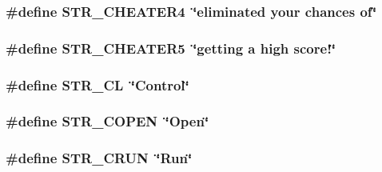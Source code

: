\label{FOREIGN_8H_a9b0cd198a6495bd0e515f7766192b57f}
\hypertarget{FOREIGN_8H_a4b8e72c3dab5be98c1d1347c5cedb2f4}{
\subsubsection[{STR\_\-CHEATER4}]{\setlength{\rightskip}{0pt plus 5cm}\#define STR\_\-CHEATER4~\char`\"{}eliminated your chances of\char`\"{}}}
\label{FOREIGN_8H_a4b8e72c3dab5be98c1d1347c5cedb2f4}
\hypertarget{FOREIGN_8H_a29835915ad7521839054c865dd6ccd25}{
\subsubsection[{STR\_\-CHEATER5}]{\setlength{\rightskip}{0pt plus 5cm}\#define STR\_\-CHEATER5~\char`\"{}getting a high score!\char`\"{}}}
\label{FOREIGN_8H_a29835915ad7521839054c865dd6ccd25}
\hypertarget{FOREIGN_8H_ab290e2bc18995113971a1da6495e2c21}{
\subsubsection[{STR\_\-CL}]{\setlength{\rightskip}{0pt plus 5cm}\#define STR\_\-CL~\char`\"{}Control\char`\"{}}}
\label{FOREIGN_8H_ab290e2bc18995113971a1da6495e2c21}
\hypertarget{FOREIGN_8H_a19f9c1096494183513c9856732ee45b3}{
\subsubsection[{STR\_\-COPEN}]{\setlength{\rightskip}{0pt plus 5cm}\#define STR\_\-COPEN~\char`\"{}Open\char`\"{}}}
\label{FOREIGN_8H_a19f9c1096494183513c9856732ee45b3}
\hypertarget{FOREIGN_8H_a2c216c6320a281ef26a1be4db3f62ec2}{
\subsubsection[{STR\_\-CRUN}]{\setlength{\rightskip}{0pt plus 5cm}\#define STR\_\-CRUN~\char`\"{}Run\char`\"{}}}
\label{FOREIGN_8H_a2c216c6320a281ef26a1be4db3f62ec2}
